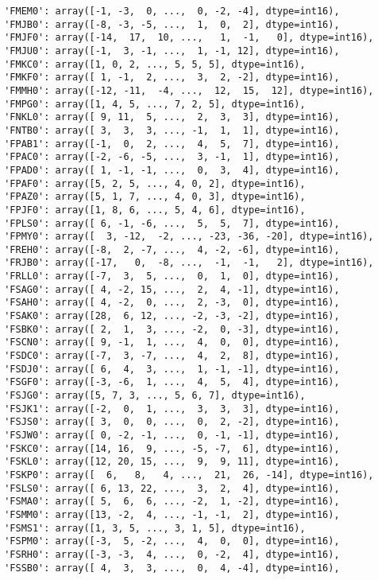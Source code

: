 \documentclass[11pt]{article}
\begin{document}
\begin{verbatim}
 'FMEM0': array([-1, -3,  0, ...,  0, -2, -4], dtype=int16),
 'FMJB0': array([-8, -3, -5, ...,  1,  0,  2], dtype=int16),
 'FMJF0': array([-14,  17,  10, ...,   1,  -1,   0], dtype=int16),
 'FMJU0': array([-1,  3, -1, ...,  1, -1, 12], dtype=int16),
 'FMKC0': array([1, 0, 2, ..., 5, 5, 5], dtype=int16),
 'FMKF0': array([ 1, -1,  2, ...,  3,  2, -2], dtype=int16),
 'FMMH0': array([-12, -11,  -4, ...,  12,  15,  12], dtype=int16),
 'FMPG0': array([1, 4, 5, ..., 7, 2, 5], dtype=int16),
 'FNKL0': array([ 9, 11,  5, ...,  2,  3,  3], dtype=int16),
 'FNTB0': array([ 3,  3,  3, ..., -1,  1,  1], dtype=int16),
 'FPAB1': array([-1,  0,  2, ...,  4,  5,  7], dtype=int16),
 'FPAC0': array([-2, -6, -5, ...,  3, -1,  1], dtype=int16),
 'FPAD0': array([ 1, -1, -1, ...,  0,  3,  4], dtype=int16),
 'FPAF0': array([5, 2, 5, ..., 4, 0, 2], dtype=int16),
 'FPAZ0': array([5, 1, 7, ..., 4, 0, 3], dtype=int16),
 'FPJF0': array([1, 8, 6, ..., 5, 4, 6], dtype=int16),
 'FPLS0': array([ 6, -1, -6, ...,  5,  5,  7], dtype=int16),
 'FPMY0': array([  3, -12,  -2, ..., -23, -36, -20], dtype=int16),
 'FREH0': array([-8,  2, -7, ...,  4, -2, -6], dtype=int16),
 'FRJB0': array([-17,   0,  -8, ...,  -1,  -1,   2], dtype=int16),
 'FRLL0': array([-7,  3,  5, ...,  0,  1,  0], dtype=int16),
 'FSAG0': array([ 4, -2, 15, ...,  2,  4, -1], dtype=int16),
 'FSAH0': array([ 4, -2,  0, ...,  2, -3,  0], dtype=int16),
 'FSAK0': array([28,  6, 12, ..., -2, -3, -2], dtype=int16),
 'FSBK0': array([ 2,  1,  3, ..., -2,  0, -3], dtype=int16),
 'FSCN0': array([ 9, -1,  1, ...,  4,  0,  0], dtype=int16),
 'FSDC0': array([-7,  3, -7, ...,  4,  2,  8], dtype=int16),
 'FSDJ0': array([ 6,  4,  3, ...,  1, -1, -1], dtype=int16),
 'FSGF0': array([-3, -6,  1, ...,  4,  5,  4], dtype=int16),
 'FSJG0': array([5, 7, 3, ..., 5, 6, 7], dtype=int16),
 'FSJK1': array([-2,  0,  1, ...,  3,  3,  3], dtype=int16),
 'FSJS0': array([ 3,  0,  0, ...,  0,  2, -2], dtype=int16),
 'FSJW0': array([ 0, -2, -1, ...,  0, -1, -1], dtype=int16),
 'FSKC0': array([14, 16,  9, ..., -5, -7,  6], dtype=int16),
 'FSKL0': array([12, 20, 15, ...,  9,  9, 11], dtype=int16),
 'FSKP0': array([  6,   8,   4, ...,  21,  26, -14], dtype=int16),
 'FSLS0': array([ 6, 13, 22, ...,  3,  2,  4], dtype=int16),
 'FSMA0': array([ 5,  6,  6, ..., -2,  1, -2], dtype=int16),
 'FSMM0': array([13, -2,  4, ..., -1, -1,  2], dtype=int16),
 'FSMS1': array([1, 3, 5, ..., 3, 1, 5], dtype=int16),
 'FSPM0': array([-3,  5, -2, ...,  4,  0,  0], dtype=int16),
 'FSRH0': array([-3, -3,  4, ...,  0, -2,  4], dtype=int16),
 'FSSB0': array([ 4,  3,  3, ...,  0,  4, -4], dtype=int16),

\end{verbatim}
\end{document}

